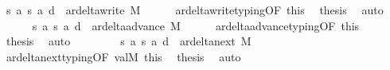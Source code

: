 \begin{isabellebody}
\ {\isachardoublequoteopen}{\isacharparenleft}{\kern0pt}s{\isacharcomma}{\kern0pt}\ a{\isacharcomma}{\kern0pt}\ s{\isacharprime}{\kern0pt}{\isacharcomma}{\kern0pt}\ a{\isacharprime}{\kern0pt}{\isacharcomma}{\kern0pt}\ d{\isacharparenright}{\kern0pt}\ {\isasymin}\ ar{\isacharunderscore}{\kern0pt}delta{\isacharunderscore}{\kern0pt}write\ M{\isachardoublequoteclose}\isanewline
\ \ \ \ \isamarkupfalse%
\ ar{\isacharunderscore}{\kern0pt}delta{\isacharunderscore}{\kern0pt}write{\isacharunderscore}{\kern0pt}typing{\isacharbrackleft}{\kern0pt}OF\ this{\isacharbrackright}{\kern0pt}\ \isamarkupfalse%
\ {\isacharquery}{\kern0pt}thesis\ \isamarkupfalse%
\ auto\isanewline
\ \ \isamarkupfalse%
\isanewline
\ \ \ \ \isamarkupfalse%
\ {\isachardoublequoteopen}{\isacharparenleft}{\kern0pt}s{\isacharcomma}{\kern0pt}\ a{\isacharcomma}{\kern0pt}\ s{\isacharprime}{\kern0pt}{\isacharcomma}{\kern0pt}\ a{\isacharprime}{\kern0pt}{\isacharcomma}{\kern0pt}\ d{\isacharparenright}{\kern0pt}\ {\isasymin}\ ar{\isacharunderscore}{\kern0pt}delta{\isacharunderscore}{\kern0pt}advance\ M{\isachardoublequoteclose}\isanewline
\ \ \ \ \isamarkupfalse%
\ ar{\isacharunderscore}{\kern0pt}delta{\isacharunderscore}{\kern0pt}advance{\isacharunderscore}{\kern0pt}typing{\isacharbrackleft}{\kern0pt}OF\ this{\isacharbrackright}{\kern0pt}\ \isamarkupfalse%
\ {\isacharquery}{\kern0pt}thesis\ \isamarkupfalse%
\ auto\isanewline
\ \ \isamarkupfalse%
\isanewline
\ \ \ \ \isamarkupfalse%
\ {\isachardoublequoteopen}{\isacharparenleft}{\kern0pt}s{\isacharcomma}{\kern0pt}\ a{\isacharcomma}{\kern0pt}\ s{\isacharprime}{\kern0pt}{\isacharcomma}{\kern0pt}\ a{\isacharprime}{\kern0pt}{\isacharcomma}{\kern0pt}\ d{\isacharparenright}{\kern0pt}\ {\isasymin}\ ar{\isacharunderscore}{\kern0pt}delta{\isacharunderscore}{\kern0pt}next\ M{\isachardoublequoteclose}\isanewline
\ \ \ \ \isamarkupfalse%
\ ar{\isacharunderscore}{\kern0pt}delta{\isacharunderscore}{\kern0pt}next{\isacharunderscore}{\kern0pt}typing{\isacharbrackleft}{\kern0pt}OF\ valM\ this{\isacharbrackright}{\kern0pt}\ \isamarkupfalse%
\ {\isacharquery}{\kern0pt}thesis\ \isamarkupfalse%
\ auto\isanewline
\ \ \isamarkupfalse%
\isanewline
{}\isamarkupfalse%
%
\endisatagproof
{\isafoldproof}%
%
\isadelimproof
%
\endisadelimproof
%
\begin{isamarkuptext}%

\end{isamarkuptext}
\end{isabellebody}
